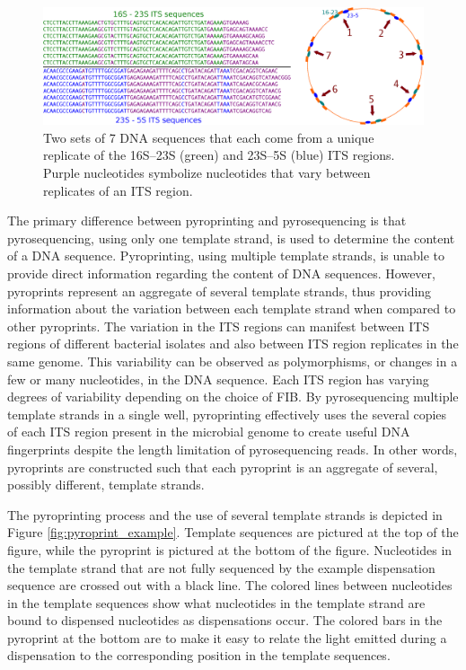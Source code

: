 \documentclass[12pt]{ucthesis}
\begin{document}
      \begin{figure}[t]
         \centering
         \includegraphics[width=\columnwidth]{graphics/sample_ITS_sequences.eps}
         \caption{Two sets of 7 DNA sequences that each come from a unique
                  replicate of the 16S--23S (green) and 23S--5S (blue) ITS
                  regions. Purple nucleotides symbolize nucleotides that vary
                  between replicates of an ITS region.}
         \label{fig:sample_ITS}
      \end{figure}
      
      The primary difference between pyroprinting and pyrosequencing is that
      pyrosequencing, using only one template strand, is used to determine the
      content of a DNA sequence.  Pyroprinting, using multiple template
      strands, is unable to provide direct information regarding the content of
      DNA sequences. However, pyroprints represent an aggregate of several
      template strands, thus providing information about the variation between
      each template strand when compared to other pyroprints. The variation in
      the ITS regions can manifest between ITS regions of different bacterial
      isolates and also between ITS region replicates in the same genome. This
      variability can be observed as polymorphisms, or changes in a few or many
      nucleotides, in the DNA sequence. Each ITS region has varying degrees of
      variability depending on the choice of FIB. By pyrosequencing multiple
      template strands in a single well, pyroprinting effectively uses the
      several copies of each ITS region present in the microbial genome to
      create useful DNA fingerprints despite the length limitation of
      pyrosequencing reads. In other words, pyroprints are constructed such
      that each pyroprint is an aggregate of several, possibly different,
      template strands.

      The pyroprinting process and the use of several template strands is
      depicted in Figure \ref{fig:pyroprint_example}. Template sequences are
      pictured at the top of the figure, while the pyroprint is pictured at the
      bottom of the figure. Nucleotides in the template strand that are not
      fully sequenced by the example dispensation sequence are crossed out with
      a black line. The colored lines between nucleotides in the template
      sequences show what nucleotides in the template strand are bound to
      dispensed nucleotides as dispensations occur. The colored bars in the
      pyroprint at the bottom are to make it easy to relate the light emitted
      during a dispensation to the corresponding position in the template
      sequences.
\end{document}

